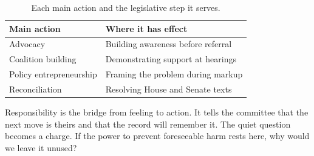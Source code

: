 \begin{table}[H]
\footnotesize
\begin{tabularx}{\textwidth}{@{}L{6.0cm} Y@{}}
\toprule
\textbf{Main action} & \textbf{Where it has effect}\\
\midrule
Advocacy & Building awareness before referral\\
Coalition building & Demonstrating support at hearings\\
Policy entrepreneurship & Framing the problem during markup\\
Reconciliation & Resolving House and Senate texts\\
\bottomrule
\end{tabularx}
\caption{Each main action and the legislative step it serves.}
\label{tab:duty}
\end{table}

Responsibility is the bridge from feeling to action. It tells the committee that
the next move is theirs and that the record will remember it. The quiet question
becomes a charge. If the power to prevent foreseeable harm rests here, why would we
leave it unused?
